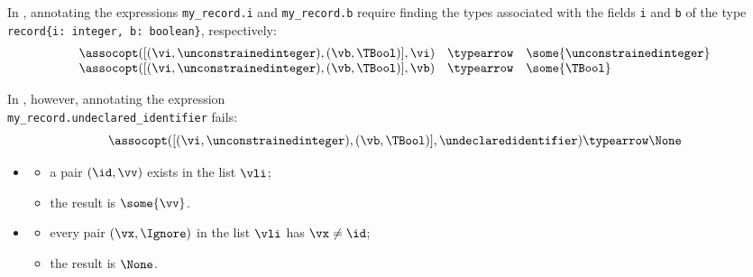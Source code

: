
In , annotating the expressions \verb|my_record.i|
and \verb|my_record.b| require finding the types associated with the fields \verb|i| and \verb|b|
of the type \\
\verb|record{i: integer, b: boolean}|, respectively:
\[
\begin{array}{rcl}
\assocopt([(\vi, \unconstrainedinteger), (\vb, \TBool)], \vi) &\typearrow& \some{\unconstrainedinteger}\\
\assocopt([(\vi, \unconstrainedinteger), (\vb, \TBool)], \vb) &\typearrow& \some{\TBool}\\
\end{array}
\]

In , however, annotating the expression \\
\verb|my_record.undeclared_identifier| fails:
\[
\assocopt([(\vi, \unconstrainedinteger), (\vb, \TBool)], \undeclaredidentifier) \typearrow \None\\
\]

\ProseParagraph
\OneApplies
\begin{itemize}
  \item {}
  \begin{itemize}
    \item a pair $(\id,\vv)$ exists in the list $\vli$;
    \item the result is $\some{\vv}$.
  \end{itemize}

  \item {}
  \begin{itemize}
    \item every pair $(\vx,\Ignore)$ in the list $\vli$ has $\vx\neq\id$;
    \item the result is $\None$.
  \end{itemize}
\end{itemize}

\FormallyParagraph
{}

